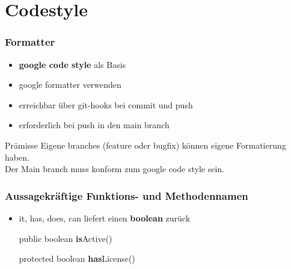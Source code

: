 \section{Codestyle}
\begin{frame}
  \frametitle{Formatter}
  \begin{itemize}
  \item \textbf{google code style} als Basis
  \item google formatter verwenden
  \item erreichbar über git-hooks bei commit und push
  \item erforderlich bei push in den main branch
  \end{itemize}
  \vspace{4mm}
  \begin{block}{Prämisse}
    Eigene branches (feature oder bugfix) können eigene Formatierung haben. \\ 
    Der Main branch muss konform zum google code style sein.
    \end{block}
\end{frame}

\begin{frame}
  \frametitle{Aussagekräftige Funktions- und Methodennamen}
  \begin{itemize}
  \item it, has, does, can liefert einen \textbf{boolean} zurück
  \begin{Beispiel}
  \vspace{3mm}
  \par public boolean \textbf{is}Active()
  \vspace{3mm}
  \par protected boolean \textbf{has}License()
  \vspace{3mm}
    \end{Beispiel}
  \end{itemize}
\end{frame}

